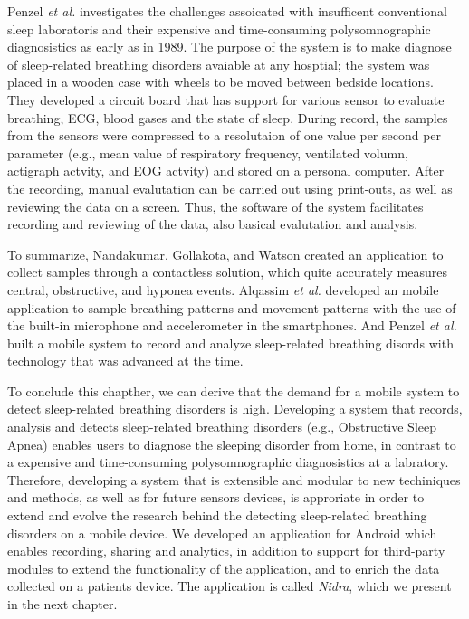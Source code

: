 Penzel \textit{et al.}\cite{mobilesleeplab} investigates the challenges assoicated with insufficent conventional sleep laboratoris and their expensive and time-consuming polysomnographic diagnosistics as early as in 1989. The purpose of the system is to make diagnose of sleep-related breathing disorders avaiable at any hosptial; the system was placed in a wooden case with wheels to be moved between bedside locations. They developed a circuit board that has support for various sensor to evaluate breathing, ECG, blood gases and the state of sleep. During record, the samples from the sensors were compressed to a resolutaion of one value per second per parameter (e.g., mean value of respiratory frequency, ventilated volumn, actigraph actvity, and EOG actvity) and stored on a personal computer. After the recording, manual evalutation can be carried out using print-outs, as well as reviewing the data on a screen. Thus, the software of the system facilitates recording and reviewing of the data, also basical evalutation and analysis. 

To summarize, Nandakumar, Gollakota, and Watson created an application to collect samples through a contactless solution, which quite accurately measures central, obstructive, and hyponea events. Alqassim \textit{et al.} developed an mobile application to sample breathing patterns and movement patterns with the use of the built-in microphone and accelerometer in the smartphones. And Penzel \textit{et al.} built a mobile system to record and analyze sleep-related breathing disords with technology that was advanced at the time.

To conclude this chapther, we can derive that the demand for a mobile system to detect sleep-related breathing disorders is high. Developing a system that records, analysis and detects sleep-related breathing disorders (e.g., Obstructive Sleep Apnea) enables users to diagnose the sleeping disorder from home, in contrast to a expensive and time-consuming polysomnographic diagnosistics at a labratory. Therefore, developing a system that is extensible and modular to new techiniques and methods, as well as for future sensors devices, is approriate in order to extend and evolve the research behind the detecting sleep-related breathing disorders on a mobile device. We developed an application for Android which enables recording, sharing and analytics, in addition to support for third-party modules to extend the functionality of the application, and to enrich the data collected on a patients device. The application is called \textit{Nidra}, which we present in the next chapter. 
